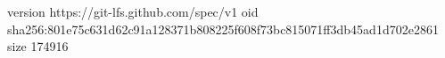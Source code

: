 version https://git-lfs.github.com/spec/v1
oid sha256:801e75c631d62c91a128371b808225f608f73bc815071ff3db45ad1d702e2861
size 174916
